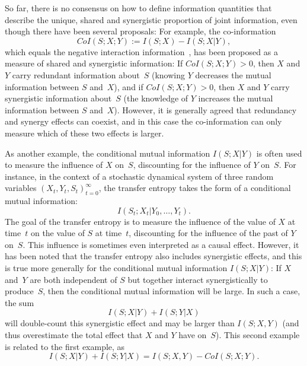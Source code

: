 \documentclass{article}
\begin{document}
So far, there is no consensus on how to define information quantities that describe the unique, shared and synergistic
proportion of joint information, even though there have been several proposals: For example, the
co-information~\cite{Bell2003:Coinformation}
\begin{equation*}
  CoI(S;X;Y) := I(S; X) - I(S; X|Y),
\end{equation*}
which equals the negative interaction information~\cite{McGill54:interaction-information}, has been proposed as a
measure of shared and synergistic information: If $CoI(S;X;Y)>0$, then $X$ and $Y$ carry redundant information about~$S$
(knowing $Y$ decreases the mutual information between $S$ and~$X$), and if $CoI(S;X;Y)>0$, then $X$ and $Y$ carry
synergistic information about~$S$ (the knowledge of $Y$ increases the mutual information between $S$ and~$X$).  However,
it is generally agreed that redundancy and synergy effects can coexist, and in this case the co-information can only
measure which of these two effects is larger.

As another example, the conditional mutual information $I(S; X|Y)$ is often used to measure the influence of $X$ on~$S$,
discounting for the influence of $Y$ on~$S$.  For instance, in the context of a stochastic dynamical system of three
random variables $(X_{t},Y_{t},S_{t})_{t=0}^{\infty}$, the transfer entropy takes the form of a conditional mutual
information:
\begin{equation*}
  I(S_{t}; X_{t}|Y_{0},\dots,Y_{t}).
\end{equation*}
The goal of the transfer entropy is to measure the influence of the value of $X$ at time~$t$ on the value of $S$ at
time~$t$, discounting for the influence of the past of $Y$ on~$S$.  This influence is sometimes even interpreted as a
causal effect.  However, it has been noted that the transfer entropy also includes synergistic effects, and this is true
more generally for the conditional mutual information $I(S; X|Y)$: If $X$ and~$Y$ are both independent of $S$ but
together interact synergistically to produce~$S$, then the conditional mutual information will be large.  In such a
case, the sum %
\begin{equation*}
  I(S; X|Y) + I(S; Y|X)
\end{equation*}
will double-count this synergistic effect and may be larger than $I(S; X,Y)$ (and thus overestimate the total effect that
$X$ and $Y$ have on~$S$).  This second example is related to the first example, as
\begin{equation*}
  I(S; X|Y) + I(S; Y|X)
  = I(S; X,Y) - CoI(S;X;Y).
\end{equation*}
\end{document}
